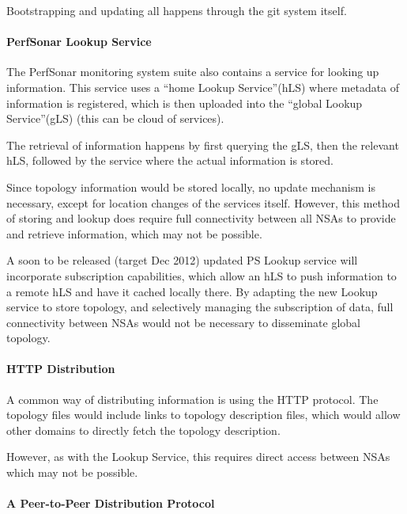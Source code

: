 \documentclass[12pt]{article}  %
\begin{document}
Bootstrapping and updating all happens through the 
git system itself.


\paragraph{PerfSonar Lookup Service}

 The PerfSonar monitoring system suite also contains a service 
for looking up information. This service uses a ``home Lookup Service''(hLS) where 
metadata of information is registered, which is then uploaded into the ``global 
Lookup Service''(gLS) (this can be cloud of services).\label{h.pg14lxc0zu6o}


The retrieval of information happens by first querying 
the gLS, then the relevant hLS, followed by the service where the actual information 
is stored.\label{h.tjjrmby8htjk}


Since topology information would be stored locally, 
no update mechanism is necessary, except for location changes of the services itself. 
However, this method of storing and lookup does require full connectivity between 
all NSAs to provide and retrieve information, which may not be possible.


 A soon to be released (target Dec 2012) updated PS Lookup service 
will incorporate subscription capabilities, which allow an hLS to push information 
to a remote hLS and have it cached locally there. By adapting the new Lookup service 
to store topology, and selectively managing the subscription of data, full connectivity 
between NSAs would not be necessary to disseminate global topology.


\paragraph{HTTP Distribution}

 A common way of distributing information is using the HTTP protocol. 
The topology files would include links to topology description files, which would 
allow other domains to directly fetch the topology description.\label{h.efkcsmt7dwgr}


However, as with the Lookup Service, this requires 
direct access between NSAs which may not be possible.\label{h.mbgns4xsvbt4}


\paragraph{A Peer-to-Peer Distribution Protocol}
\end{document}
